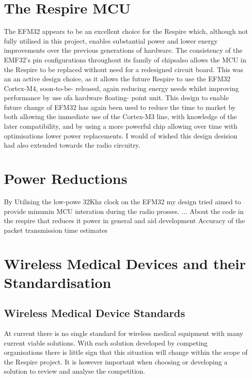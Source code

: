 \section{The Respire MCU}
The EFM32 appears to be an excellent choice for the Respire which, although not fully utilised in this
project, enables substantial power and lower energy improvements over the previous generations of
hardware. The consistency of the EMF32’s pin configurations throughout its family of chipsalso
allows the MCU in the Respire to be replaced without need for a redesigned circuit board. This was
an an active design choice, as it allows the future Respire to use the EFM32 Cortex-M4, soon-to-be-
released, again reducing energy needs whilst improving performance by use ofa hardware floating-
point unit. This design to enable future change of EFM32 has again been used to reduce the time to
market by both allowing the immediate use of the Cortex-M3 line, with knowledge of the later
compatibility, and by using a more powerful chip allowing over time with optimisations lower power
replacements. I would of wished this design desision had also extended towards the radio circuitry.

\section{Power Reductions}
By Utilising the low-powe 32Khz clock on the EFM32 my design tried aimed to provide minumin MCU
interation during the radio prosses. ...
About the code in the respire that reduces it power in general and aid development
Accuracy of the packet transmission time estimates

\section{Wireless Medical Devices and their Standardisation}

\subsection{Wireless Medical Device Standards}
At current there is no single standard for wireless medical equipment with many current viable
solutions. With each solution developed by competing organisations there is little sign that this
situation will change within the scope of the Respire project. It is however important when choosing
or developing a solution to review and analyse the competition.

